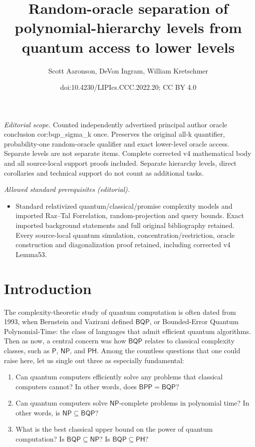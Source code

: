 \documentclass[10pt,a4paper]{article}
\title{Random-oracle separation of polynomial-hierarchy levels from quantum access to lower levels}
\author{Scott Aaronson, DeVon Ingram, William Kretschmer}
\date{doi:10.4230/LIPIcs.CCC.2022.20; CC BY 4.0}
\begin{document}
\maketitle
\noindent\textit{Editorial scope.} Counted independently advertised principal author oracle conclusion cor:bqp\_sigma\_k once. Preserves the original all-k quantifier, probability-one random-oracle qualifier and exact lower-level oracle access. Separate levels are not separate items. Complete corrected v4 mathematical body and all source-local support proofs included. Separate hierarchy levels, direct corollaries and technical support do not count as additional tasks.\par\medskip
\noindent\textit{Allowed standard prerequisites (editorial).}\begin{itemize}
\item Standard relativized quantum/classical/promise complexity models and imported Raz–Tal Forrelation, random-projection and query bounds. Exact imported background statements and full original bibliography retained. Every source-local quantum simulation, concentration/restriction, oracle construction and diagonalization proof retained, including corrected v4 Lemma53.
\end{itemize}\medskip
\section{Introduction\label{INTRO}}

The complexity-theoretic study of quantum computation is often dated from 1993, when Bernstein and Vazirani \cite{BV97} defined $\mathsf{BQP}$, or Bounded-Error Quantum Polynomial-Time: the class of languages that admit efficient quantum algorithms.  Then as now, a central concern was how $\mathsf{BQP}$ relates to classical complexity classes, such as $\mathsf{P}$, $\mathsf{NP}$, and $\mathsf{PH}$.  Among the countless questions that one could raise here, let us single out three as especially fundamental:
\begin{enumerate}[(1)]
\item Can quantum computers efficiently solve any problems that classical computers cannot?  In other words, does $\mathsf{BPP}= \mathsf{BQP}$?
\item Can quantum computers solve $\mathsf{NP}$-complete problems in polynomial time?  In other words, is $\mathsf{NP} \subseteq \mathsf{BQP}$?
\item What is the best classical upper bound on the power of quantum computation?  Is $\mathsf{BQP} \subseteq \mathsf{NP}$?  Is $\mathsf{BQP} \subseteq \mathsf{PH}$?
\end{enumerate}
\end{document}
